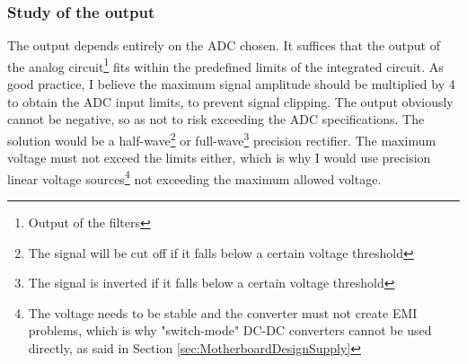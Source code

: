\documentclass[a4paper, 10pt, final]{article} %
\begin{document}
    \subsubsection{Study of the output}\label{sec:SensorboardDesignOutput}
    The output depends entirely on the ADC chosen.
    It suffices that the output of the analog circuit\footnote{Output of the filters} fits within the predefined limits of the integrated circuit.
    As good practice, I believe the maximum signal amplitude should be multiplied by 4 to obtain the ADC input limits, to prevent signal clipping.
    The output obviously cannot be negative, so as not to risk exceeding the ADC specifications.
    The solution would be a half-wave\footnote{The signal will be cut off if it falls below a certain voltage threshold} or full-wave\footnote{The signal is inverted if it falls below a certain voltage threshold} precision rectifier.
    The maximum voltage must not exceed the limits either, which is why I would use precision linear voltage sources\footnote{The voltage needs to be stable and the converter must not create EMI problems, which is why "switch-mode" DC-DC converters cannot be used directly, as said in Section \ref{sec:MotherboardDesignSupply}} not exceeding the maximum allowed voltage.
\end{document}
